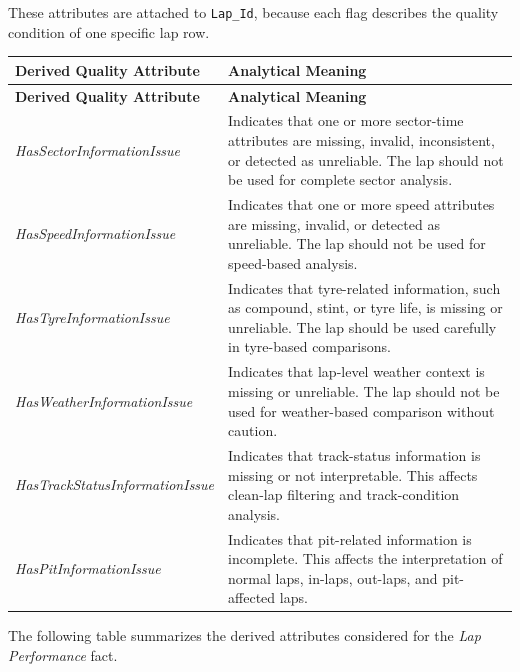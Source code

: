 \documentclass[a4paper,11pt]{article}
\begin{document}
	
	These attributes are attached to \texttt{Lap\_Id}, because each flag describes the quality
	condition of one specific lap row.
	
	\begin{longtable}{|p{5.2cm}|p{8.8cm}|}
		\hline
		\textbf{Derived Quality Attribute} & \textbf{Analytical Meaning} \\
		\hline
		\endfirsthead
		
		\hline
		\textbf{Derived Quality Attribute} & \textbf{Analytical Meaning} \\
		\hline
		\endhead
		
		\textit{HasSectorInformationIssue}
		&
		Indicates that one or more sector-time attributes are missing, invalid, inconsistent, or detected as unreliable. The lap should not be used for complete sector analysis.
		\\
		\hline
		
		\textit{HasSpeedInformationIssue}
		&
		Indicates that one or more speed attributes are missing, invalid, or detected as unreliable. The lap should not be used for speed-based analysis.
		\\
		\hline
		
		\textit{HasTyreInformationIssue}
		&
		Indicates that tyre-related information, such as compound, stint, or tyre life, is missing or unreliable. The lap should be used carefully in tyre-based comparisons.
		\\
		\hline
		
		\textit{HasWeatherInformationIssue}
		&
		Indicates that lap-level weather context is missing or unreliable. The lap should not be used for weather-based comparison without caution.
		\\
		\hline
		
		\textit{HasTrackStatusInformationIssue}
		&
		Indicates that track-status information is missing or not interpretable. This affects clean-lap filtering and track-condition analysis.
		\\
		\hline
		
		\textit{HasPitInformationIssue}
		&
		Indicates that pit-related information is incomplete. This affects the interpretation of normal laps, in-laps, out-laps, and pit-affected laps.
		\\
		\hline
		
	\end{longtable}
	

	

	
	The following table summarizes the derived attributes considered for the
	\textit{Lap Performance} fact.
	
\end{document}

